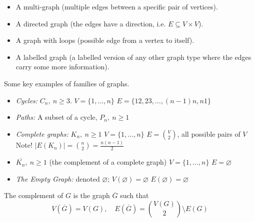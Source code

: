 \begin{itemize}
    \item A multi-graph (multiple edges between a specific pair of vertices).
    \item A directed graph (the edges have a direction, i.e. $E\subseteq V\times V$).
    \item A graph with loops (possible edge from a vertex to itself).
    \item A labelled graph (a labelled version of any other graph type where the edges carry some more information).
\end{itemize}


\begin{example}
Some key examples of families of graphs.
\begin{itemize}
    \item \emph{Cycles:} $C_n,\ n\geq 3$.\newline
    $V=\{1,\dots,n\}$\newline
    $E=\{12,23,\dots,(n-1)n,n1\}$
    \item \emph{Paths:} A subset of a cycle, $P_n,\ n\geq 1$
    \item \emph{Complete graphs:} $K_n,\ n\geq 1$\newline 
    $V=\{1,\dots,n\}$\newline
    $E={V \choose 2}$, all possible pairs of $V$\newline
    Note! $|E(K_n)|={n \choose 2}=\frac{n(n-1)}{2}$
    \item $\overline{K_n},\ n\geq 1$ (the complement of a complete graph)\newline 
    $V=\{1,\dots,n\}$\newline
    $E=\varnothing$
    \item \emph{The Empty Graph:} denoted $\varnothing$;\newline 
    $V(\varnothing)=\varnothing$\newline
    $E(\varnothing)=\varnothing$
\end{itemize}
\end{example}

\begin{definition}
The complement of $G$ is the graph $\overline{G}$ such that
$$
V(\overline{G})=V(G),\quad E(\overline{G})= {V(G)\choose 2}\setminus E(G)
$$
\end{definition}

